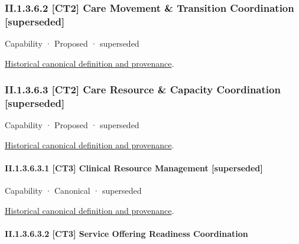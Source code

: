 \subsubsection*{II.1.3.6.2 [CT2] Care Movement \& Transition Coordination [superseded]}
\label{navigation:II.1.3.6.2}

\label{element:59b9331fa3c04ef09bf963ad8a5d0d71}
{\small Capability · Proposed · superseded}\par
\href{../../../../continuum/strategy/capability/59b9331fa3c04ef09bf963ad8a5d0d71.md}{Historical canonical definition and provenance}.\par
\subsubsection*{II.1.3.6.3 [CT2] Care Resource \& Capacity Coordination [superseded]}
\label{navigation:II.1.3.6.3}

\label{element:96f71cb8fa6844d7aa7e9f16759a3a62}
{\small Capability · Proposed · superseded}\par
\href{../../../../continuum/strategy/capability/96f71cb8fa6844d7aa7e9f16759a3a62.md}{Historical canonical definition and provenance}.\par
\paragraph*{II.1.3.6.3.1 [CT3] Clinical Resource Management [superseded]}
\label{navigation:II.1.3.6.3.1}

\label{element:a5faedcd97064c28b9e7e551e9106ea1}
{\small Capability · Canonical · superseded}\par
\href{../../../../continuum/strategy/capability/a5faedcd97064c28b9e7e551e9106ea1.md}{Historical canonical definition and provenance}.\par
\paragraph*{II.1.3.6.3.2 [CT3] Service Offering Readiness Coordination}
\label{navigation:II.1.3.6.3.2}

